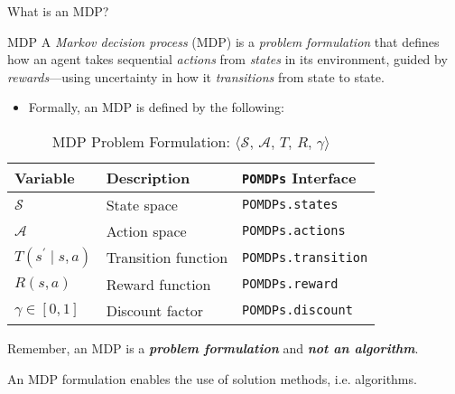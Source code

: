 \begin{frame}[fragile]{What is an MDP?}

\begin{definitionblock}{MDP}
    A \textit{Markov decision process} (MDP) is a \textit{problem formulation} that defines how an agent takes sequential \textit{actions} from \textit{states} in its environment, guided by \textit{rewards}---using uncertainty in how it \textit{transitions} from state to state.
\end{definitionblock}

\phantom{}

\begin{itemize}
    \item Formally, an MDP is defined by the following:
\end{itemize}
\begin{table}[!t]
    {\scriptsize
    \centering
    \caption{\label{tab:solutions} MDP Problem Formulation: $\langle \mathcal{S},\, \mathcal{A},\, T,\, R,\, \gamma \rangle$}
    \begin{threeparttable}
    \begin{tabular}{lll}
        \toprule
        \textbf{Variable} & \textbf{Description} & \textbf{\texttt{POMDPs} Interface} \\
        \midrule
        $\mathcal{S}$ & State space & \texttt{POMDPs.states} \\
        $\mathcal{A}$ & Action space & \texttt{POMDPs.actions} \\
        $T(s^\prime \mid s,a)$ & Transition function & \texttt{POMDPs.transition} \\
        $R(s,a)$ & Reward function & \texttt{POMDPs.reward} \\
        $\gamma \in [0,1]$ & Discount factor & \texttt{POMDPs.discount} \\
        \bottomrule
    \end{tabular}
    \end{threeparttable}
    }
\end{table}

\begin{importantblock}
    {\tiny
    \begin{center}
    Remember, an MDP is a \textit{\textbf{problem formulation}} and \textit{\textbf{not an algorithm}}.
  
    An MDP formulation enables the use of solution methods, i.e. algorithms.
    \end{center}
    }
\end{importantblock}

\end{frame}

